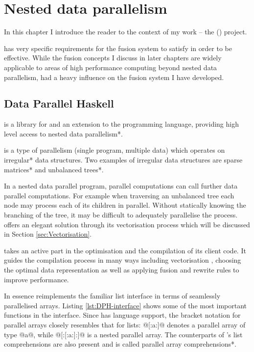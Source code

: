 \documentclass[preamble.tex]{subfiles}
\begin{document}
\clearpage

\chapter{Nested data parallelism}
\label{ch:NDP}

In this chapter I introduce the reader to the context of my work -- the  (\DPH) project.\idph

\DPH has very specific requirements for the fusion system to satisfy in order to be effective. While the fusion concepts I discuss in later chapters are widely applicable to areas of high performance computing beyond nested data parallelism, \DPH had a heavy influence on the fusion system I have developed.


\section{Data Parallel Haskell}
\label{sec:DPH}

\idph is a library for and an extension to the \Haskell programming language, providing high level access to \*nested data parallelism*.

\indp is a type of  parallelism (single program, multiple data) which operates on \*irregular* data structures. Two examples of irregular data structures are \*sparse matrices* and \*unbalanced trees*.

In a nested data parallel program, parallel computations can call further data parallel computations. For example when traversing an unbalanced tree each node may process each of its children in parallel. Without statically knowing the branching of the tree, it may be difficult to adequately parallelise the process. \DPH offers an elegant solution through its vectorisation process which will be discussed in Section \ref{sec:Vectorisation}.

\DPH takes an active part in the optimisation and the compilation of its client code. It guides the compilation process in many ways including vectorisation \cite{PLKC08}, choosing the optimal data representation \cite{InstantGenerics} as well as applying fusion \cite{CLP+07} and rewrite rules \cite{PTH01} to improve performance.

In essence \DPH reimplements the familiar list interface in terms of seamlessly parallelised arrays. Listing \ref{lst:DPH-interface} shows some of the most important functions in the \DPH interface. Since \DPH has language support, the bracket notation for parallel arrays closely resembles that for \Haskell lists: @[:a:]@ denotes a parallel array of type @a@, while @[:[:a:]:]@ is a nested parallel array. The counterparts of \Haskell's list comprehensions are also present and is called \*parallel array comprehensions*.
\end{document}
